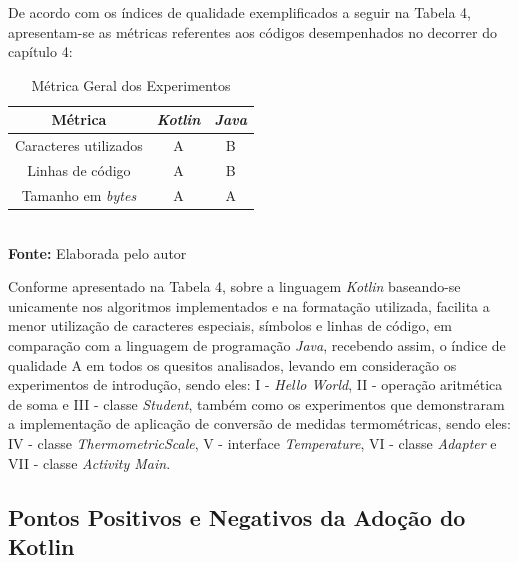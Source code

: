 De acordo com os índices de qualidade exemplificados a seguir na Tabela 4, apresentam-se as métricas referentes aos códigos desempenhados no decorrer do capítulo 4:

\FloatBarrier
\begin{table}[!htbp]
\centering
\caption{Métrica Geral dos Experimentos}
	\begin{tabular}{ c | c | c }
		\hline
        \textbf{Métrica} &  \textbf{\textit{Kotlin}}    & \textbf{\textit{Java}}  \\ \hline
		
		  Caracteres utilizados   &     A 	       &            B     \\ \hline
		             
		  Linhas de código        &     A          &            B       \\ \hline
		             
		  Tamanho em \textit{bytes}        &     A          &            A      \\ \hline
		  
	\end{tabular}
	\\ \vspace{0.2cm}
	\textbf{Fonte:} Elaborada pelo autor
	\label{tab:exemplo}
\end{table}
\FloatBarrier

Conforme apresentado na Tabela 4, sobre a linguagem \textit{Kotlin} baseando-se unicamente nos algoritmos implementados e na formatação utilizada, facilita a menor utilização de caracteres especiais, símbolos e linhas de código, em comparação com a linguagem de programação \textit{Java}, recebendo assim, o índice de qualidade A em todos os quesitos analisados, levando em consideração os experimentos de introdução, sendo eles: I - \textit{Hello World}, II - operação aritmética de soma e III - classe \textit{Student}, também como os experimentos que demonstraram a implementação de aplicação de conversão de medidas termométricas, sendo eles:  IV - classe \textit{ThermometricScale}, V - interface \textit{Temperature}, VI - classe \textit{Adapter} e VII - classe \textit{Activity Main}.

\subsection{Pontos Positivos e Negativos da Adoção do Kotlin}

